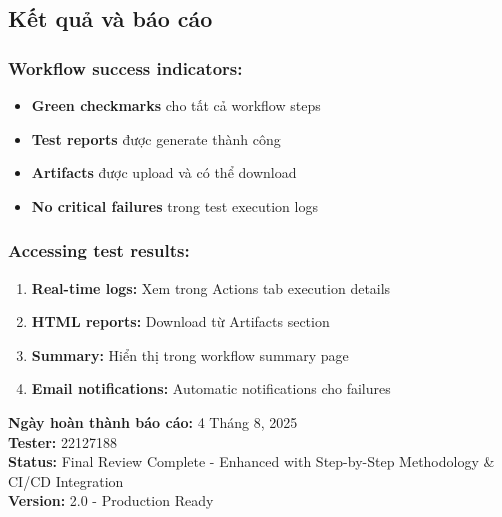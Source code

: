 \documentclass[12pt,a4paper]{article}
\begin{document}
  \subsection{Kết quả và báo cáo}

  \subsubsection{Workflow success indicators:}

  \begin{itemize}
  \item \textbf{Green checkmarks} cho tất cả workflow steps
  \item \textbf{Test reports} được generate thành công
  \item \textbf{Artifacts} được upload và có thể download
  \item \textbf{No critical failures} trong test execution logs
  \end{itemize}

  \subsubsection{Accessing test results:}

  \begin{enumerate}
  \item \textbf{Real-time logs:} Xem trong Actions tab execution details
  \item \textbf{HTML reports:} Download từ Artifacts section
  \item \textbf{Summary:} Hiển thị trong workflow summary page
  \item \textbf{Email notifications:} Automatic notifications cho failures
  \end{enumerate}

  \vspace{2cm}

  \noindent\textbf{Ngày hoàn thành báo cáo:} 4 Tháng 8, 2025\\
  \textbf{Tester:} 22127188\\
  \textbf{Status:} Final Review Complete - Enhanced with Step-by-Step Methodology \& CI/CD Integration\\
  \textbf{Version:} 2.0 - Production Ready

  
\end{document}
